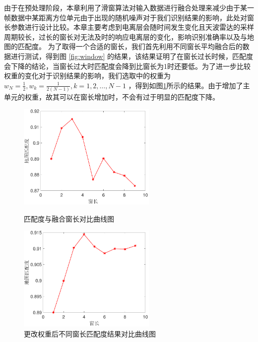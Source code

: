 由于在预处理阶段，本章利用了滑窗算法对输入数据进行融合处理来减少由于某一帧数据中某距离方位单元由于出现的随机噪声对于我们识别结果的影响，此处对窗长参数进行设计比较。本章主要考虑到电离层会随时间发生变化且天波雷达的采样周期较长，过长的窗长对无法及时的响应电离层的变化，影响识别准确率以及与地图的匹配度。
为了取得一个合适的窗长，我们首先利用不同窗长平均融合后的数据进行测试，得到图 \ref{fig:window} 的结果，该结果证明了在窗长过长时候，匹配度会下降的结论，当窗长过大时匹配度会降到比窗长为1时还要低。为了进一步比较权重的变化对于识别结果的影响，我们选取中的权重为$w_N=\frac{1}{2},w_k=\frac{1}{2(N-1)},k=1,2,\dots,N-1$
，得到如图\ref{fig:weighted_window}所示的结果。由于增加了主单元的权重，故其可以在窗长增加时，不会有过于明显的匹配度下降。


\begin{figure}[H]
	\centering
	\begin{minipage}{7cm}
		\centering
		\includegraphics[width=6.67cm]{figures/othr/window}
		\caption{匹配度与融合窗长对比曲线图}
		\label{fig:window}
	\end{minipage}
	\hspace{10pt}
	\begin{minipage}{7cm}
		\centering
		\includegraphics[width=6.67cm]{figures/othr/weighted_window}
		\caption{更改权重后不同窗长匹配度结果对比曲线图}
		\label{fig:weighted_window}
	\end{minipage}

\end{figure}


